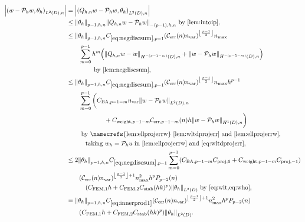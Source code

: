 \begin{align}
\abs{\IPLtDn{w- \Ph w}{\thetah}} &= \abs{\IPLtDn{\Qhn w - \Ph w}{\thetah}}\nonumber\\
&\leq \Nfn{p-1,h,n}{\thetah}\Nfn{-(p-1),h,n}{\Qhn w - \Ph w}\text{ by \cref{lem:intoip},}\nonumber\\
&\leq \Nfn{p-1,h,n}{\thetah} \Csumfn{p-1} \mleft(\En \nvar\mright)^{\floor{\frac{p-1}2}}\nmax\nonumber\\
&\quad\quad\sum_{m=0}^{p-1} h^{m}\mleft(\NHnfn{-(p-1-m)}{D}{\Qhn w - w}+ \NHnfn{-(p-1-m)}{D}{w - \Ph w}\mright)\nonumber\\
&\quad\quad\quad\quad\text{ by \cref{lem:negdiscsum},}\nonumber\\
&\leq \Nfn{p-1,h,n}{\thetah} \Csumfn{p-1}\mleft(\En \nvar\mright)^{\floor{\frac{p-1}2}}\nmax h^{p-1}\nonumber\\
&\quad\quad\sum_{m=0}^{p-1} \bigg(\CSZfn{p-1-m}\nvar \NLtDn{w - \Ph w}\nonumber\\
&\quad\quad\quad\quad\quad\quad+ \Cwfn{p-1-m} \errn{p-1-m} h \NHoDn{w - \Ph w}\bigg)\nonumber\\
&\quad\quad\text{ by \namecrefs{lem:ellprojerrw} \ref{lem:wltdprojerr} and \ref{lem:ellprojerrw},}\nonumber\\
&\quad\quad\quad\text{taking $\wh = \Ph u$ in \cref{lem:ellprojerrw} and \cref{eq:wltdprojerr},}\nonumber\\
&\leq2 \Nfn{p-1,h,n}{\thetah} \Csumfn{p-1}\sum_{m=0}^{p-1} \mleft(\CSZfn{p-1-m}\Cprojfn{0} + \Cwfn{p-1-m} \Cprojfn{-1}\mright)\nonumber\\
&\quad\quad\mleft(\En \nvar\mright)^{\floor{\frac{p-1}2}+1}\nmax^2  h^p \Pfn{p-2}\mleft(n\mright)\nonumber\\
&\quad\quad\quad\mleft(\CFEMotilde h + \CFEMttilde \CAnk (hk)^p\mright) \NLtD{\thetah} \text{ by \cref{eq:wlt,eq:who},}\nonumber\\
&=\Nfn{p-1,h,n}{\thetah}  \Cfourteen \mleft(\En \nvar\mright)^{\floor{\frac{p-1}2}+1}\nmax^2 h^p \Pfn{p-2}\mleft(n\mright)\nonumber\\
&\quad\quad\mleft(\CFEMotilde h + \CFEMttilde \CAnk (hk)^p\mright) \NLtD{\thetah} \label{eq:innerprod1}.
\end{align}

